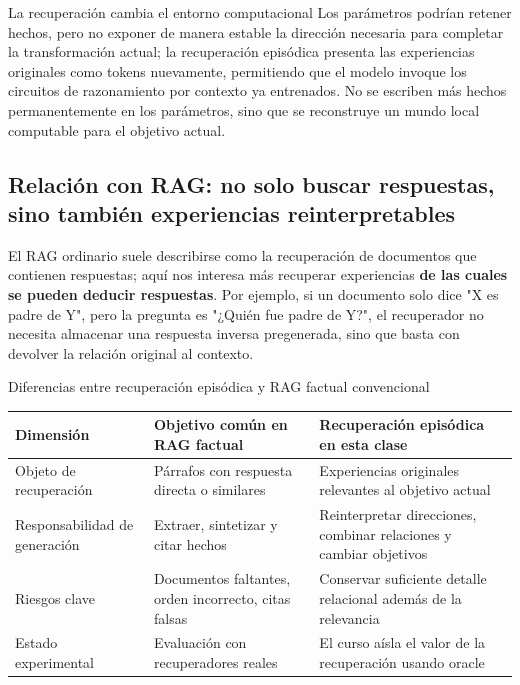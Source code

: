 
\begin{importantbox}{La recuperación cambia el entorno computacional}
Los parámetros podrían retener hechos, pero no exponer de manera estable la dirección necesaria para completar la transformación actual; la recuperación episódica presenta las experiencias originales como tokens nuevamente, permitiendo que el modelo invoque los circuitos de razonamiento por contexto ya entrenados. No se escriben más hechos permanentemente en los parámetros, sino que se reconstruye un mundo local computable para el objetivo actual.
\end{importantbox}

\subsection{Relación con RAG: no solo buscar respuestas, sino también experiencias reinterpretables}

El RAG ordinario suele describirse como la recuperación de documentos que contienen respuestas; aquí nos interesa más recuperar experiencias \textbf{de las cuales se pueden deducir respuestas}. Por ejemplo, si un documento solo dice "X es padre de Y", pero la pregunta es "¿Quién fue padre de Y?", el recuperador no necesita almacenar una respuesta inversa pregenerada, sino que basta con devolver la relación original al contexto.

\begin{knowledgebox}{Diferencias entre recuperación episódica y RAG factual convencional}
\begin{tabularx}{\textwidth}{L{0.24\textwidth}X X}
\toprule
Dimensión & Objetivo común en RAG factual & Recuperación episódica en esta clase \\
\midrule
Objeto de recuperación & Párrafos con respuesta directa o similares & Experiencias originales relevantes al objetivo actual \\
Responsabilidad de generación & Extraer, sintetizar y citar hechos & Reinterpretar direcciones, combinar relaciones y cambiar objetivos \\
Riesgos clave & Documentos faltantes, orden incorrecto, citas falsas & Conservar suficiente detalle relacional además de la relevancia \\
Estado experimental & Evaluación con recuperadores reales & El curso aísla el valor de la recuperación usando oracle \\
\bottomrule
\end{tabularx}
\end{knowledgebox}

